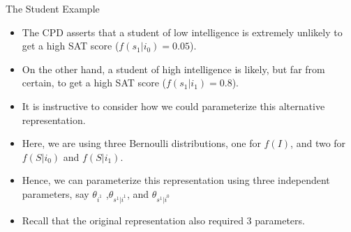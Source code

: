 \documentclass[handout]{beamer}
\begin{document}
\begin{frame}{The Student Example}
\scriptsize{
\begin{itemize}

\item The CPD asserts that a student of low intelligence is extremely unlikely to get a high SAT score ($f(s_1 | i_0 ) = 0.05$).
\item On the other hand, a student of high intelligence is likely, but far from
certain, to get a high SAT score ($f(s_1 | i_1 ) = 0.8$).

\item It is instructive to consider how we could parameterize this alternative representation. 
\item Here, we are using three Bernoulli distributions, one for $f(I)$, and two for $f(S | i_0)$ and $f(S|i_1)$.
\item Hence, we can parameterize this representation using three independent parameters, say $\theta_{i^1}$ ,$\theta_{s^1|i^1}$, and $\theta_{s^1|i^0}$

\item Recall that the original representation also required 3 parameters.



\end{itemize}



} 

\end{frame}
\end{document}
